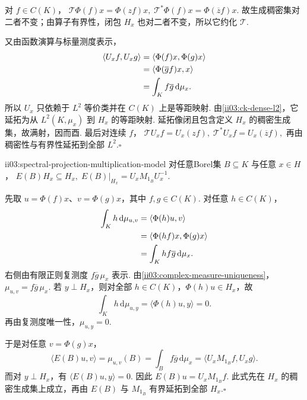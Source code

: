 \begin{FAProof}
对 \(\displaystyle f\in C(K)\)，
\(\displaystyle \mathcal T\Phi(f)x=\Phi(zf)x, \; \mathcal T^*\Phi(f)x=\Phi(\overline z f)x.\)
故生成稠密集对二者不变；由算子有界性，闭包 \(\displaystyle H_x\) 也对二者不变，所以它约化 \(\displaystyle\mathcal T\).

又由函数演算与标量测度表示，
\[
\begin{aligned}
\displaystyle \langle U_xf,U_xg\rangle &\displaystyle =\langle\Phi(f)x,\Phi(g)x\rangle\\
\displaystyle &\displaystyle =\langle\Phi(\overline g f)x,x\rangle\\
\displaystyle &\displaystyle =\int_K f\overline g\,\mathrm{d}\mu_x.
\end{aligned}
\]
所以 \(\displaystyle U_x\) 只依赖于 \(\displaystyle L^2\) 等价类并在 \(\displaystyle C(K)\) 上是等距映射. 由\autoref{ii03:ck-dense-l2}，它延拓为从 \(\displaystyle L^2(K,\mu_x)\) 到 \(\displaystyle H_x\) 的等距映射. 延拓像闭且包含定义 \(\displaystyle H_x\) 的稠密生成集，故满射，因而酉. 最后对连续 \(\displaystyle f\)，
\(\displaystyle \mathcal T U_xf=U_x(zf), \; \mathcal T^*U_xf=U_x(\overline z f),\)
再由稠密性与有界性延拓到全部 \(\displaystyle L^2\).\hfill\(\square\)
\end{FAProof}

\begin{FAProposition}[B][谱投影的乘法模型]{ii03:spectral-projection-multiplication-model}
对任意Borel集 \(\displaystyle B\subseteq K\) 与任意 \(\displaystyle x\in H\)，
\(\displaystyle E(B)H_x\subseteq H_x, \; E(B)|_{H_x}=U_xM_{1_B}U_x^{-1}.\)
\end{FAProposition}

\begin{FAProof}
先取 \(\displaystyle u=\Phi(f)x\)、\(\displaystyle v=\Phi(g)x\)，其中 \(\displaystyle f,g\in C(K)\). 对任意 \(\displaystyle h\in C(K)\)，
\[
\begin{aligned}
\displaystyle \int_K h\,\mathrm{d}\mu_{u,v} &\displaystyle =\langle\Phi(h)u,v\rangle\\
\displaystyle &\displaystyle =\langle\Phi(hf)x,\Phi(g)x\rangle\\
\displaystyle &\displaystyle =\int_K hf\overline g\,\mathrm{d}\mu_x.
\end{aligned}
\]
右侧由有限正则复测度 \(\displaystyle f\overline g\,\mu_x\) 表示. 由\autoref{ii03:complex-measure-uniqueness}，
\(\displaystyle \mu_{u,v}=f\overline g\,\mu_x.\)
若 \(\displaystyle y\perp H_x\)，则对全部 \(\displaystyle h\in C(K)\)，\(\displaystyle\Phi(h)u\in H_x\)，故
\[
\int_K h\,\mathrm{d}\mu_{u,y}
=\langle\Phi(h)u,y\rangle=0.
\]
再由复测度唯一性，\(\displaystyle\mu_{u,y}=0\).

于是对任意 \(\displaystyle v=\Phi(g)x\)，
\[
\langle E(B)u,v\rangle=\mu_{u,v}(B)=\int_B f\overline g\,\mathrm{d}\mu_x=\langle U_xM_{1_B}f,U_xg\rangle.
\]
而对 \(\displaystyle y\perp H_x\)，有 \(\displaystyle\langle E(B)u,y\rangle=0\). 因此
\(\displaystyle E(B)u=U_xM_{1_B}f.\)
此式先在 \(\displaystyle H_x\) 的稠密生成集上成立，再由 \(\displaystyle E(B)\) 与 \(\displaystyle M_{1_B}\) 有界延拓到全部 \(\displaystyle H_x\).\hfill\(\square\)
\end{FAProof}


